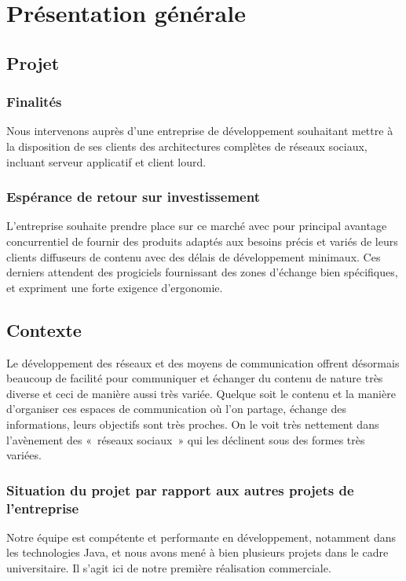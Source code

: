 \section{Présentation générale}
\subsection{Projet}
\subsubsection{Finalités}

Nous intervenons auprès d'une entreprise de développement souhaitant met\-tre à la disposition de ses clients des architectures complètes de réseaux sociaux, incluant serveur applicatif et client lourd.

\subsubsection{Espérance de retour sur investissement}

L'entreprise souhaite prendre place sur ce marché avec pour principal avantage concurrentiel de fournir des produits adaptés aux besoins précis et variés de leurs clients diffuseurs de contenu avec des délais de développement minimaux. Ces derniers attendent des progiciels fournissant des zones d'échange bien spécifiques, et expriment une forte exigence d'ergonomie.

\subsection{Contexte}

Le développement des réseaux et des moyens de communication offrent désormais beaucoup de facilité pour communiquer et échanger du contenu de nature très diverse et ceci de manière aussi très variée. Quelque soit le contenu et la manière d’organiser ces espaces de communication où l’on partage, échange des informations, leurs objectifs sont très proches.
On le voit très nettement dans l’avènement des «~réseaux sociaux~» qui les déclinent sous des formes très variées.

\subsubsection{Situation du projet par rapport aux autres projets de l’entreprise}

Notre équipe est compétente et performante en développement, notamment dans les technologies Java, et nous avons mené à bien plusieurs projets dans le cadre universitaire. Il s'agit ici de notre première réalisation commerciale.

